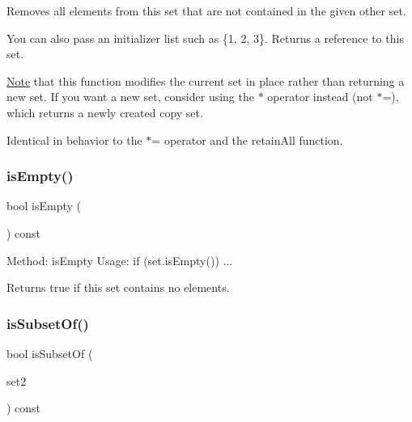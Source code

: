 Removes all elements from this set that are not contained in the given other set. 

You can also pass an initializer list such as \{1, 2, 3\}. Returns a reference to this set.

\mbox{\hyperlink{classNote}{Note}} that this function modifies the current set in place rather than returning a new set. If you want a new set, consider using the $\ast$ operator instead (not $\ast$=), which returns a newly created copy set.

Identical in behavior to the $\ast$= operator and the retain\+All function. \mbox{\label{classstanfordcpplib_1_1collections_1_1GenericSet_acf82f9b2937375c7b1cf3dccb3df3312}} 
\subsubsection{\texorpdfstring{is\+Empty()}{isEmpty()}}
{\footnotesize\ttfamily bool is\+Empty (\begin{DoxyParamCaption}{ }\end{DoxyParamCaption}) const}



Method\+: is\+Empty Usage\+: if (set.\+is\+Empty()) ... 



 Returns {\ttfamily true} if this set contains no elements. \mbox{\label{classstanfordcpplib_1_1collections_1_1GenericSet_af8ce41f03d31f89935db1f3f5fdffc2c}} 
\subsubsection{\texorpdfstring{is\+Subset\+Of()}{isSubsetOf()}}
{\footnotesize\ttfamily bool is\+Subset\+Of (\begin{DoxyParamCaption}\item[{const \mbox{\hyperlink{classstanfordcpplib_1_1collections_1_1GenericSet}{Generic\+Set}}$<$ \mbox{\hyperlink{structstanfordcpplib_1_1collections_1_1SetTraits}{Set\+Traits}} $>$ \&}]{set2 }\end{DoxyParamCaption}) const}



